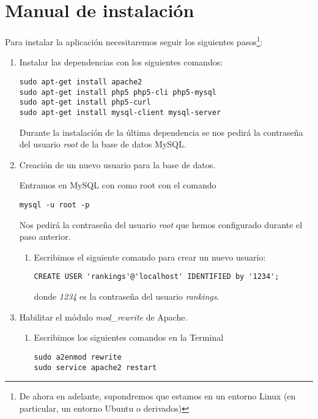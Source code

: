\chapter{Manual de instalación}

Para instalar la aplicación necesitaremos seguir los siguientes pasos\footnote{De ahora en adelante, supondremos que estamos en un entorno Linux (en particular, un entorno Ubuntu o derivados)}:

\begin{enumerate}
\item Instalar las dependencias con los siguientes comandos:

\begin{verbatim}
sudo apt-get install apache2
sudo apt-get install php5 php5-cli php5-mysql
sudo apt-get install php5-curl
sudo apt-get install mysql-client mysql-server
\end{verbatim}

Durante la instalación de la última dependencia se nos pedirá la contraseña del usuario \emph{root} de la base de datos MySQL.

\item Creación de un nuevo usuario para la base de datos. 

Entramos en MySQL con como root con el comando

\begin{verbatim}
mysql -u root -p
\end{verbatim}

Nos pedirá la contraseña del usuario \emph{root} que hemos configurado durante el paso anterior.

\begin{enumerate}
\item Escribimos el siguiente comando para crear un nuevo usuario:

\begin{verbatim}
CREATE USER 'rankings'@'localhost' IDENTIFIED by '1234';
\end{verbatim}

donde \emph{1234} es la contraseña del usuario \emph{rankings}.
\end{enumerate}

\item Habilitar el módulo \emph{mod\_rewrite} de Apache.

\begin{enumerate}
\item Escribimos los siguientes comandos en la Terminal

\begin{verbatim}
sudo a2enmod rewrite
sudo service apache2 restart
\end{verbatim}



\end{enumerate}
\end{enumerate}
